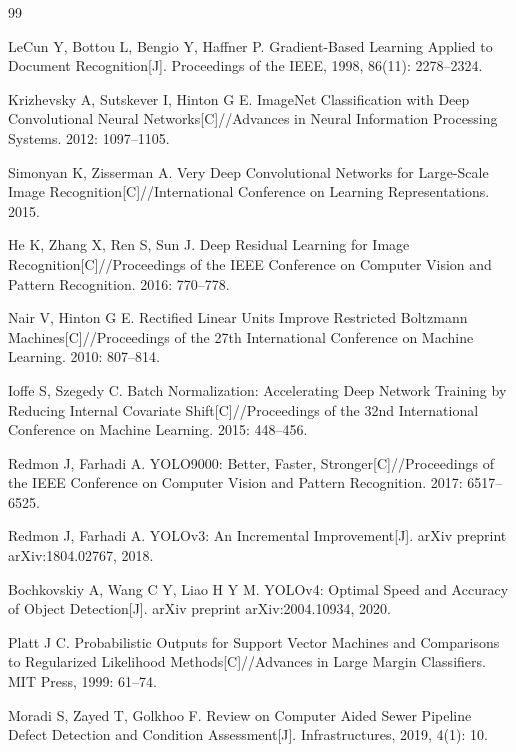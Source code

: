 \documentclass[UTF8,openany,12pt]{ctexbook}
\begin{document}
\backmatter
\begin{thebibliography}{99}

LeCun Y, Bottou L, Bengio Y, Haffner P. Gradient-Based Learning Applied to Document Recognition[J]. Proceedings of the IEEE, 1998, 86(11): 2278--2324.

Krizhevsky A, Sutskever I, Hinton G E. ImageNet Classification with Deep Convolutional Neural Networks[C]//Advances in Neural Information Processing Systems. 2012: 1097--1105.

Simonyan K, Zisserman A. Very Deep Convolutional Networks for Large-Scale Image Recognition[C]//International Conference on Learning Representations. 2015.

He K, Zhang X, Ren S, Sun J. Deep Residual Learning for Image Recognition[C]//Proceedings of the IEEE Conference on Computer Vision and Pattern Recognition. 2016: 770--778.

Nair V, Hinton G E. Rectified Linear Units Improve Restricted Boltzmann Machines[C]//Proceedings of the 27th International Conference on Machine Learning. 2010: 807--814.

Ioffe S, Szegedy C. Batch Normalization: Accelerating Deep Network Training by Reducing Internal Covariate Shift[C]//Proceedings of the 32nd International Conference on Machine Learning. 2015: 448--456.

Redmon J, Farhadi A. YOLO9000: Better, Faster, Stronger[C]//Proceedings of the IEEE Conference on Computer Vision and Pattern Recognition. 2017: 6517--6525.

Redmon J, Farhadi A. YOLOv3: An Incremental Improvement[J]. arXiv preprint arXiv:1804.02767, 2018.

Bochkovskiy A, Wang C Y, Liao H Y M. YOLOv4: Optimal Speed and Accuracy of Object Detection[J]. arXiv preprint arXiv:2004.10934, 2020.

Platt J C. Probabilistic Outputs for Support Vector Machines and Comparisons to Regularized Likelihood Methods[C]//Advances in Large Margin Classifiers. MIT Press, 1999: 61--74.

Moradi S, Zayed T, Golkhoo F. Review on Computer Aided Sewer Pipeline Defect Detection and Condition Assessment[J]. Infrastructures, 2019, 4(1): 10.


\end{thebibliography}
\end{document}
